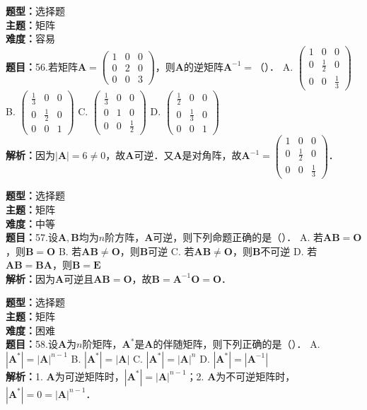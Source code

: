 \documentclass{ctexart}
\newenvironment{question}[5]{%
	\noindent\textbf{题型：}#1\\
	\textbf{主题：}#2\\
	\textbf{难度：}#3\\
	\textbf{题目：}#4\\
	\textbf{解析：}#5\\
	\vspace{1em}
}{}
\begin{document}
	\begin{question}
		{选择题}
		{矩阵}
		{容易}
		{56.若矩阵\(\mathbf{A}=\left(\begin{array}{lll}1 & 0 & 0 \\ 0 & 2 & 0 \\ 0 & 0 & 3\end{array}\right)\)，则\(\mathbf{A}\)的逆矩阵\(\mathbf{A}^{-1}=\)（）．
			A. \(\left(\begin{array}{ccc}1 & 0 & 0 \\ 0 & \frac{1}{2} & 0 \\ 0 & 0 & \frac{1}{3}\end{array}\right)\)
			B. \(\left(\begin{array}{ccc}\frac{1}{3} & 0 & 0 \\ 0 & \frac{1}{2} & 0 \\ 0 & 0 & 1\end{array}\right)\)
			C. \(\left(\begin{array}{ccc}\frac{1}{3} & 0 & 0 \\ 0 & 1 & 0 \\ 0 & 0 & \frac{1}{2}\end{array}\right)\)
			D. \(\left(\begin{array}{ccc}\frac{1}{2} & 0 & 0 \\ 0 & \frac{1}{3} & 0 \\ 0 & 0 & 1\end{array}\right)\)}
		{因为\(|\mathbf{A}|=6 \neq 0\)，故\(\mathbf{A}\)可逆．又\(\mathbf{A}\)是对角阵，故\(\mathbf{A}^{-1}=\left(\begin{array}{ccc}1 & 0 & 0 \\ 0 & \frac{1}{2} & 0 \\ 0 & 0 & \frac{1}{3}\end{array}\right)\)．}
	\end{question}
	
	\begin{question}
		{选择题}
		{矩阵}
		{中等}
		{57.设\(\mathbf{A}, \mathbf{B}\)均为\(n\)阶方阵，\(\mathbf{A}\)可逆，则下列命题正确的是（）．
			A. 若\(\mathbf{A B}=\mathbf{O}\)，则\(\mathbf{B}=\mathbf{O}\)
			B. 若\(\mathbf{A B} \neq \mathbf{O}\)，则\(\mathbf{B}\)可逆
			C. 若\(\mathbf{A B} \neq \mathbf{O}\)，则\(\mathbf{B}\)不可逆
			D. 若\(\mathbf{A B}=\mathbf{B A}\)，则\(\mathbf{B}=\mathbf{E}\)}
		{因为\(\mathbf{A}\)可逆且\(\mathbf{A B}=\mathbf{O}\)，故\(\mathbf{B}=\mathbf{A}^{-1} \mathbf{O}=\mathbf{O}\)．}
	\end{question}
	
	\begin{question}
		{选择题}
		{矩阵}
		{困难}
		{58.设\(\mathbf{A}\)为\(n\)阶矩阵，\(\mathbf{A}^*\)是\(\mathbf{A}\)的伴随矩阵，则下列正确的是（）．
			A. \(\left|\mathbf{A}^*\right|=|\mathbf{A}|^{n-1}\)
			B. \(\left|\mathbf{A}^*\right|=|\mathbf{A}|\)
			C. \(\left|\mathbf{A}^*\right|=|\mathbf{A}|^n\)
			D. \(\left|\mathbf{A}^*\right|=\left|\mathbf{A}^{-1}\right|\)}
		{1. \(\mathbf{A}\)为可逆矩阵时，\(\left|\mathbf{A}^*\right|=|\mathbf{A}|^{n-1}\)；2. \(\mathbf{A}\)为不可逆矩阵时，\(\left|\mathbf{A}^*\right|=0=|\mathbf{A}|^{n-1}\)．}
	\end{question}
	
\end{document}
